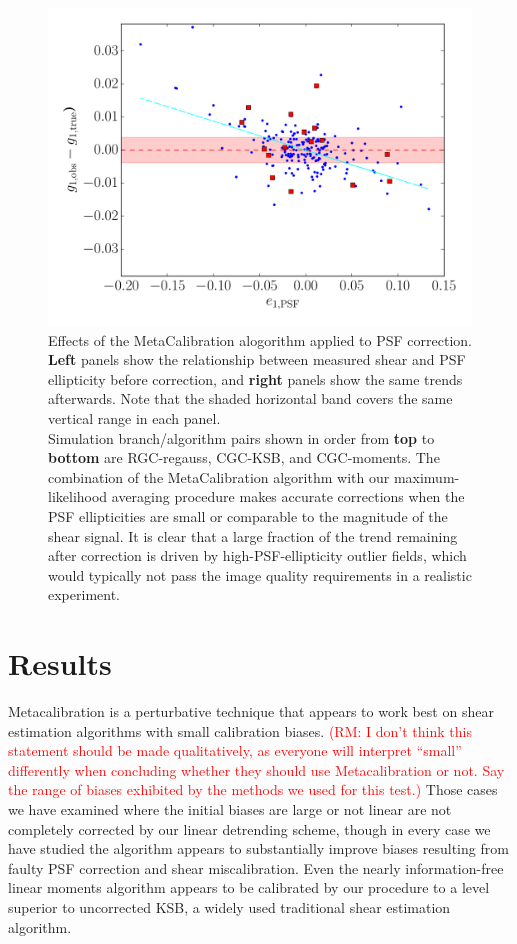 \documentclass[iop]{emulateapj}
\newcommand\rmcomment[1]{\textcolor{red}{(RM: #1)}}
\begin{document}
\begin{figure}
\begin{center}
\includegraphics[width=0.4\linewidth]{./Plots/psf_e1-moments-opt-shear_plots.pdf}
\end{center}
\caption{Effects of the MetaCalibration alogorithm applied to PSF
  correction. {\bf Left} panels show the relationship between measured
  shear and PSF ellipticity before correction, and {\bf right} panels
  show the same trends afterwards. Note that the shaded horizontal
  band covers the same vertical range in each panel.  \\
  Simulation branch/algorithm pairs shown in order from {\bf top} to
  {\bf bottom} are RGC-regauss, CGC-KSB, and CGC-moments. The
  combination of the MetaCalibration algorithm with our
  maximum-likelihood averaging procedure makes accurate corrections
  when the PSF ellipticities are small or comparable to the magnitude
  of the shear signal. It is clear that a large fraction of the trend
  remaining after correction is driven by high-PSF-ellipticity outlier
  fields, which would typically not pass the image quality
  requirements in a realistic experiment.}
\end{figure}


\section{Results}
Metacalibration is a perturbative technique that appears to work best
on shear estimation algorithms with small calibration biases. \rmcomment{I don't think this
  statement should be made qualitatively, as everyone will interpret ``small'' differently when
  concluding whether they should use Metacalibration or not.  Say the range of biases exhibited by
  the methods we used for this test.} Those
cases we have examined where the initial biases are large or not
linear are not completely corrected by our linear detrending scheme,
though in every case we have studied the algorithm appears to
substantially improve biases resulting from faulty PSF correction and
shear miscalibration. Even the nearly information-free linear moments
algorithm appears to be calibrated by our procedure to a level
superior to uncorrected KSB, a widely used traditional shear estimation algorithm.
\end{document}
